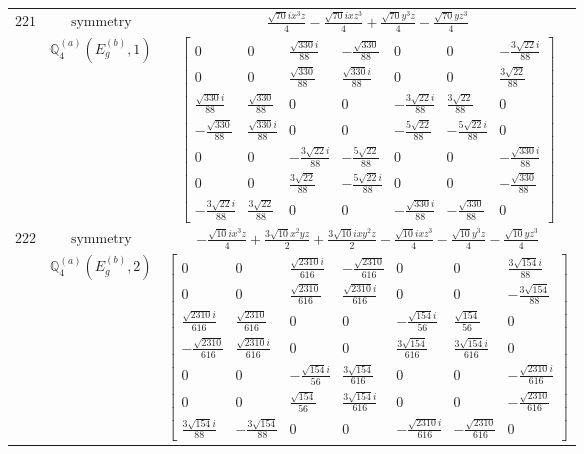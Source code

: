 \documentclass[fleqn,8pt,landscape]{jsarticle}
\begin{document}
\begin{longtable}{ccc}
$ 221 $ & $ \text{symmetry} $ & $ \frac{\sqrt{70} i x^{3} z}{4} - \frac{\sqrt{70} i x z^{3}}{4} + \frac{\sqrt{70} y^{3} z}{4} - \frac{\sqrt{70} y z^{3}}{4} $ \\
$  $ & $ \mathbb{Q}_{4}^{(a)}(E_{g}^{(b)},1) $ & $ \begin{bmatrix} 0 & 0 & \frac{\sqrt{330} i}{88} & - \frac{\sqrt{330}}{88} & 0 & 0 & - \frac{3 \sqrt{22} i}{88} \\ 0 & 0 & \frac{\sqrt{330}}{88} & \frac{\sqrt{330} i}{88} & 0 & 0 & \frac{3 \sqrt{22}}{88} \\ \frac{\sqrt{330} i}{88} & \frac{\sqrt{330}}{88} & 0 & 0 & - \frac{3 \sqrt{22} i}{88} & \frac{3 \sqrt{22}}{88} & 0 \\ - \frac{\sqrt{330}}{88} & \frac{\sqrt{330} i}{88} & 0 & 0 & - \frac{5 \sqrt{22}}{88} & - \frac{5 \sqrt{22} i}{88} & 0 \\ 0 & 0 & - \frac{3 \sqrt{22} i}{88} & - \frac{5 \sqrt{22}}{88} & 0 & 0 & - \frac{\sqrt{330} i}{88} \\ 0 & 0 & \frac{3 \sqrt{22}}{88} & - \frac{5 \sqrt{22} i}{88} & 0 & 0 & - \frac{\sqrt{330}}{88} \\ - \frac{3 \sqrt{22} i}{88} & \frac{3 \sqrt{22}}{88} & 0 & 0 & - \frac{\sqrt{330} i}{88} & - \frac{\sqrt{330}}{88} & 0 \end{bmatrix} $ \\ \hline
$ 222 $ & $ \text{symmetry} $ & $ - \frac{\sqrt{10} i x^{3} z}{4} + \frac{3 \sqrt{10} x^{2} y z}{2} + \frac{3 \sqrt{10} i x y^{2} z}{2} - \frac{\sqrt{10} i x z^{3}}{4} - \frac{\sqrt{10} y^{3} z}{4} - \frac{\sqrt{10} y z^{3}}{4} $ \\
$  $ & $ \mathbb{Q}_{4}^{(a)}(E_{g}^{(b)},2) $ & $ \begin{bmatrix} 0 & 0 & \frac{\sqrt{2310} i}{616} & - \frac{\sqrt{2310}}{616} & 0 & 0 & \frac{3 \sqrt{154} i}{88} \\ 0 & 0 & \frac{\sqrt{2310}}{616} & \frac{\sqrt{2310} i}{616} & 0 & 0 & - \frac{3 \sqrt{154}}{88} \\ \frac{\sqrt{2310} i}{616} & \frac{\sqrt{2310}}{616} & 0 & 0 & - \frac{\sqrt{154} i}{56} & \frac{\sqrt{154}}{56} & 0 \\ - \frac{\sqrt{2310}}{616} & \frac{\sqrt{2310} i}{616} & 0 & 0 & \frac{3 \sqrt{154}}{616} & \frac{3 \sqrt{154} i}{616} & 0 \\ 0 & 0 & - \frac{\sqrt{154} i}{56} & \frac{3 \sqrt{154}}{616} & 0 & 0 & - \frac{\sqrt{2310} i}{616} \\ 0 & 0 & \frac{\sqrt{154}}{56} & \frac{3 \sqrt{154} i}{616} & 0 & 0 & - \frac{\sqrt{2310}}{616} \\ \frac{3 \sqrt{154} i}{88} & - \frac{3 \sqrt{154}}{88} & 0 & 0 & - \frac{\sqrt{2310} i}{616} & - \frac{\sqrt{2310}}{616} & 0 \end{bmatrix} $ \\ \hline

\end{longtable}
\end{document}

